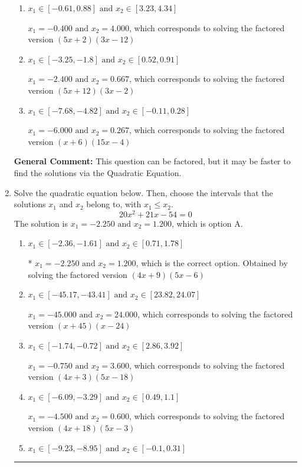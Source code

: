 \documentclass{extbook}[14pt]
\newcommand{\litem}[1]{\item #1

\rule{\textwidth}{0.4pt}}
\begin{document}
\begin{enumerate}
{\begin{enumerate}[label=\Alph*.]
$x_1 = -18.000 \text{ and } x_2 = 20.000$, which corresponds to solving the factored version $(x + 18)(x -20)$
\item \( x_1 \in [-0.61, 0.88] \text{ and } x_2 \in [3.23, 4.34] \)

$x_1 = -0.400 \text{ and } x_2 = 4.000$, which corresponds to solving the factored version $(5x + 2)(3x -12)$
\item \( x_1 \in [-3.25, -1.8] \text{ and } x_2 \in [0.52, 0.91] \)

$x_1 = -2.400 \text{ and } x_2 = 0.667$, which corresponds to solving the factored version $(5x + 12)(3x -2)$
\item \( x_1 \in [-7.68, -4.82] \text{ and } x_2 \in [-0.11, 0.28] \)

$x_1 = -6.000 \text{ and } x_2 = 0.267$, which corresponds to solving the factored version $(x + 6)(15x -4)$
\end{enumerate}

\textbf{General Comment:} This question can be factored, but it may be faster to find the solutions via the Quadratic Equation.
}
\litem{
Solve the quadratic equation below. Then, choose the intervals that the solutions $x_1$ and $x_2$ belong to, with $x_1 \leq x_2$.
\[ 20x^{2} +21 x -54 = 0 \]The solution is \( x_1 = -2.250 \text{ and } x_2 = 1.200 \), which is option A.\begin{enumerate}[label=\Alph*.]
\item \( x_1 \in [-2.36, -1.61] \text{ and } x_2 \in [0.71, 1.78] \)

* $x_1 = -2.250 \text{ and } x_2 = 1.200$, which is the correct option. Obtained by solving the factored version $(4x + 9)(5x -6)$
\item \( x_1 \in [-45.17, -43.41] \text{ and } x_2 \in [23.82, 24.07] \)

$x_1 = -45.000 \text{ and } x_2 = 24.000$, which corresponds to solving the factored version $(x + 45)(x -24)$
\item \( x_1 \in [-1.74, -0.72] \text{ and } x_2 \in [2.86, 3.92] \)

$x_1 = -0.750 \text{ and } x_2 = 3.600$, which corresponds to solving the factored version $(4x + 3)(5x -18)$
\item \( x_1 \in [-6.09, -3.29] \text{ and } x_2 \in [0.49, 1.1] \)

$x_1 = -4.500 \text{ and } x_2 = 0.600$, which corresponds to solving the factored version $(4x + 18)(5x -3)$
\item \( x_1 \in [-9.23, -8.95] \text{ and } x_2 \in [-0.1, 0.31] \)


\end{enumerate}}
\end{enumerate}
\end{document}
